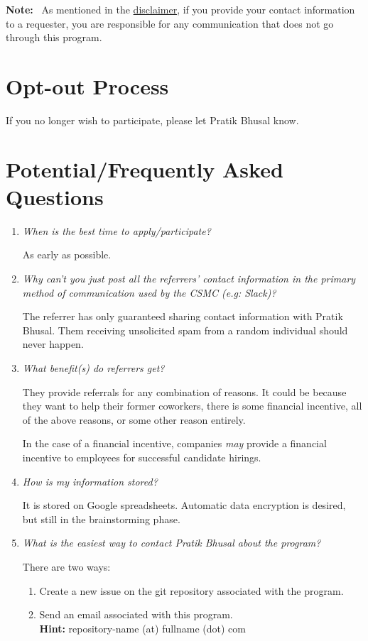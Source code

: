 \documentclass[letterpaper, 12pt]{article}
\newcommand{\QA}[2]{\textit{#1}\medskip

    #2\bigskip
}
\newcommand{\note}[1]{\textbf{Note:}~#1}
\begin{document}
\note{%
    As mentioned in the \hyperref[section:disclaimer:spamMessages]{disclaimer},
    if you provide your contact information to a requester, you are responsible
    for any communication that does not go through this program.
}

\section{Opt-out Process}

If you no longer wish to participate, please let Pratik Bhusal know.

\section{Potential/Frequently Asked Questions}

\begin{enumerate}[leftmargin=*]
    \item\QA%
        {When is the best time to apply/participate?}
        {As early as possible.}
    \item\QA%
        {%
            Why can't you just post all the referrers' contact information in
            the primary method of communication used by the CSMC (e.g: Slack)?
        }
        {%
            The referrer has only guaranteed sharing contact information with
            Pratik Bhusal. Them receiving unsolicited spam from a random
            individual should never happen.
        }
    \item\QA%
        {%
            What benefit(s) do referrers get?
        }
        {%
            They provide referrals for any combination of reasons. It could be
            because they want to help their former coworkers, there is some
            financial incentive, all of the above reasons, or some other reason
            entirely.

            In the case of a financial incentive, companies \textit{may} provide
            a financial incentive to employees for successful candidate hirings.
        }
    \item\QA%
        {How is my information stored?}
        {%
            It is stored on Google spreadsheets. Automatic data encryption is
            desired, but still in the brainstorming phase.
        }
    \item\QA%
        {What is the easiest way to contact Pratik Bhusal about the program?}
        {%
            There are two ways:

            \begin{enumerate}
                \item Create a new issue on the git repository associated with
                    the program.
                \item Send an email associated with this
                    program.\\\textbf{Hint:} repository-name (at) fullname (dot) com


\end{enumerate}}
\end{enumerate}
\end{document}
